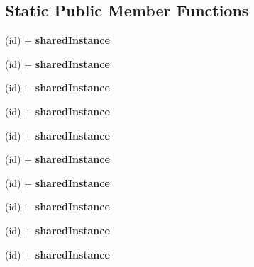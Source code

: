 \subsection*{\-Static \-Public \-Member \-Functions}
\begin{DoxyCompactItemize}
\item 
\hypertarget{interface_s_b_json_stream_writer_state_ab01e9e997789a8f04bc4730801aab8ca}{
(id) + {\bfseries shared\-Instance}}
\label{interface_s_b_json_stream_writer_state_ab01e9e997789a8f04bc4730801aab8ca}

\item 
\hypertarget{interface_s_b_json_stream_writer_state_ab01e9e997789a8f04bc4730801aab8ca}{
(id) + {\bfseries shared\-Instance}}
\label{interface_s_b_json_stream_writer_state_ab01e9e997789a8f04bc4730801aab8ca}

\item 
\hypertarget{interface_s_b_json_stream_writer_state_ab01e9e997789a8f04bc4730801aab8ca}{
(id) + {\bfseries shared\-Instance}}
\label{interface_s_b_json_stream_writer_state_ab01e9e997789a8f04bc4730801aab8ca}

\item 
\hypertarget{interface_s_b_json_stream_writer_state_ab01e9e997789a8f04bc4730801aab8ca}{
(id) + {\bfseries shared\-Instance}}
\label{interface_s_b_json_stream_writer_state_ab01e9e997789a8f04bc4730801aab8ca}

\item 
\hypertarget{interface_s_b_json_stream_writer_state_ab01e9e997789a8f04bc4730801aab8ca}{
(id) + {\bfseries shared\-Instance}}
\label{interface_s_b_json_stream_writer_state_ab01e9e997789a8f04bc4730801aab8ca}

\item 
\hypertarget{interface_s_b_json_stream_writer_state_ab01e9e997789a8f04bc4730801aab8ca}{
(id) + {\bfseries shared\-Instance}}
\label{interface_s_b_json_stream_writer_state_ab01e9e997789a8f04bc4730801aab8ca}

\item 
\hypertarget{interface_s_b_json_stream_writer_state_ab01e9e997789a8f04bc4730801aab8ca}{
(id) + {\bfseries shared\-Instance}}
\label{interface_s_b_json_stream_writer_state_ab01e9e997789a8f04bc4730801aab8ca}

\item 
\hypertarget{interface_s_b_json_stream_writer_state_ab01e9e997789a8f04bc4730801aab8ca}{
(id) + {\bfseries shared\-Instance}}
\label{interface_s_b_json_stream_writer_state_ab01e9e997789a8f04bc4730801aab8ca}

\item 
\hypertarget{interface_s_b_json_stream_writer_state_ab01e9e997789a8f04bc4730801aab8ca}{
(id) + {\bfseries shared\-Instance}}
\label{interface_s_b_json_stream_writer_state_ab01e9e997789a8f04bc4730801aab8ca}

\item 
\hypertarget{interface_s_b_json_stream_writer_state_ab01e9e997789a8f04bc4730801aab8ca}{
(id) + {\bfseries shared\-Instance}}
\label{interface_s_b_json_stream_writer_state_ab01e9e997789a8f04bc4730801aab8ca}

\end{DoxyCompactItemize}


